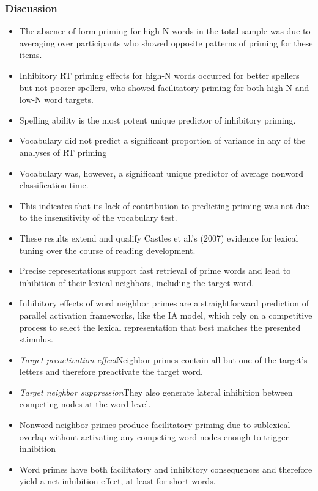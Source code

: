 \documentclass[]{article}
\begin{document}
			\subsubsection{Discussion}
			\begin{itemize}
				\item The absence of form priming for high-N words in the total sample was due to averaging over participants who showed opposite patterns of priming for these items. 
				\item Inhibitory RT priming effects for high-N words occurred for better spellers but not poorer spellers, who showed facilitatory priming for both high-N and low-N word targets.
				\item Spelling ability is the most potent unique predictor of inhibitory priming.
				\item Vocabulary did not predict a significant proportion of variance in any of the analyses of RT priming
				\item Vocabulary was, however, a significant unique predictor of average nonword classification time.
				\item This indicates that its lack of contribution to predicting priming was not due to the insensitivity of the vocabulary test.
				\item These results extend and qualify Castles et al.’s (2007) evidence for lexical tuning over the course of reading development.
				\item Precise representations support fast retrieval of prime words and lead to inhibition of their lexical neighbors, including the target word.
				\item Inhibitory effects of word neighbor primes are a straightforward prediction of parallel activation frameworks, like the IA model, which rely on a competitive process to select the lexical representation that best matches the presented stimulus.
				\item \textit{Target preactivation effect}\textendash 	Neighbor primes contain all but one of the target’s letters and therefore preactivate the target word.
				\item \textit{Target neighbor suppression}\textendash They also generate lateral inhibition between competing nodes at the word level.
				\item Nonword neighbor primes produce facilitatory priming due to sublexical overlap without activating any competing word nodes enough to trigger inhibition
				\item Word primes have both facilitatory and inhibitory consequences and therefore yield a net inhibition effect, at least for short words.

\end{itemize}
\end{document}
